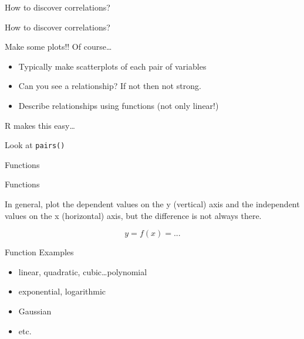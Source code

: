 \documentclass{beamer}
\begin{document}
\begin{frame}{How to discover correlations?}

\end{frame}


\begin{frame}{How to discover correlations?}

Make some plots!!  Of course\ldots

\begin{itemize}
\item Typically make scatterplots of each pair of variables
\item Can you see a relationship?  If not then not strong.
\item Describe relationships using functions (not only linear!)
\end{itemize}

\end{frame}


\begin{frame}{R makes this easy\ldots}

Look at \texttt{pairs()}

\end{frame}



\begin{frame}{Functions}

\end{frame}



\begin{frame}{Functions}

In general, plot the dependent values on the y (vertical) axis and the independent values on the x (horizontal) axis, but the difference is not always there.

\begin{displaymath}
y = f(x) = ...
\end{displaymath}

\end{frame}


\begin{frame}{Function Examples}


\begin{itemize}
\item linear, quadratic, cubic\ldots polynomial
\item exponential, logarithmic
\item Gaussian
\item etc.
\end{itemize}


\end{frame}
\end{document}
